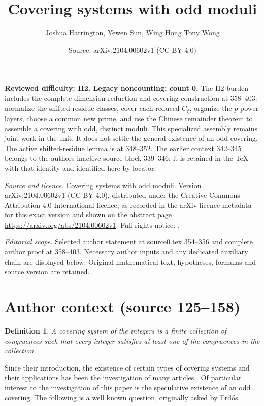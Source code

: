 \documentclass[10pt,a4paper]{amsart}
\title[Covering systems with odd moduli]{Covering systems with odd moduli}
\author{Joshua Harrington, Yewen Sun, Wing Hong Tony Wong}
\date{Source: arXiv:2104.00602v1 (CC BY 4.0)}
\newtheorem{definition}{Definition}
\begin{document}
\maketitle
\noindent\textbf{Reviewed difficulty: H2. Legacy noncounting; count 0.} The H2 burden includes the complete dimension reduction and covering construction at 358--403: normalize the shifted residue classes, cover each reduced $C_\xi$, organize the $p$-power layers, choose a common new prime, and use the Chinese remainder theorem to assemble a covering with odd, distinct moduli. This specialized assembly remains joint work in the unit. It does not settle the general existence of an odd covering. The active shifted-residue lemma is at 348--352. The earlier context 342--345 belongs to the author\textquotesingle s inactive source block 339--346; it is retained in the TeX with that identity and identified here by locator.\par\medskip

\noindent\emph{Source and licence.} Covering systems with odd moduli. Version arXiv:2104.00602v1 (CC BY 4.0), distributed under the Creative Commons Attribution 4.0 International licence, as recorded in the arXiv licence metadata for this exact version and shown on the abstract page \url{https://arxiv.org/abs/2104.00602v1}. Full rights notice: .\par\smallskip


\noindent\textit{Editorial scope.} Selected author statement at source0.tex 354--356 and complete author proof at 358--403. Necessary author inputs and any dedicated auxiliary chain are displayed below. Original mathematical text, hypotheses, formulas and source version are retained.\par\smallskip
\section*{Author context (source 125--158)}
\begin{definition}
A \emph{covering system of the integers} is a finite collection of congruences such that every integer satisfies at least one of the congruences in the collection.
\end{definition}

Since their introduction, the existence of certain types of covering systems and their applications has been the investigation of many articles \cite{ffk2008,ffk,ffkpy,filharr,fh,fj,hough,jw,n,o}.  Of particular interest to the investigation of this paper is the speculative existence of an odd covering.  The following is a well known question, originally asked by Erd\H{o}s.
\end{document}
